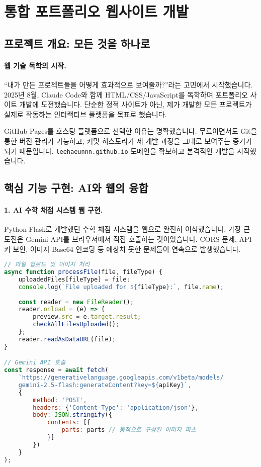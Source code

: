 \section{통합 포트폴리오 웹사이트 개발}

\subsection{프로젝트 개요: 모든 것을 하나로}

\paragraph{웹 기술 독학의 시작.}
``내가 만든 프로젝트들을 어떻게 효과적으로 보여줄까?''라는 고민에서 시작했습니다. 2025년 8월, Claude Code와 함께 HTML/CSS/JavaScript를 독학하며 포트폴리오 사이트 개발에 도전했습니다. 단순한 정적 사이트가 아닌, 제가 개발한 모든 프로젝트가 실제로 작동하는 인터랙티브 플랫폼을 목표로 했습니다.

GitHub Pages를 호스팅 플랫폼으로 선택한 이유는 명확했습니다. 무료이면서도 Git을 통한 버전 관리가 가능하고, 커밋 히스토리가 제 개발 과정을 그대로 보여주는 증거가 되기 때문입니다. \texttt{leehaeunnn.github.io} 도메인을 확보하고 본격적인 개발을 시작했습니다.

\subsection{핵심 기능 구현: AI와 웹의 융합}

\paragraph{1. AI 수학 채점 시스템 웹 구현.}
Python Flask로 개발했던 수학 채점 시스템을 웹으로 완전히 이식했습니다. 가장 큰 도전은 Gemini API를 브라우저에서 직접 호출하는 것이었습니다. CORS 문제, API 키 보안, 이미지 Base64 인코딩 등 예상치 못한 문제들이 연속으로 발생했습니다.

\begin{lstlisting}[language=JavaScript]
// 파일 업로드 및 이미지 처리
async function processFile(file, fileType) {
    uploadedFiles[fileType] = file;
    console.log(`File uploaded for ${fileType}:`, file.name);
    
    const reader = new FileReader();
    reader.onload = (e) => {
        preview.src = e.target.result;
        checkAllFilesUploaded();
    };
    reader.readAsDataURL(file);
}

// Gemini API 호출
const response = await fetch(
    `https://generativelanguage.googleapis.com/v1beta/models/
    gemini-2.5-flash:generateContent?key=${apiKey}`,
    {
        method: 'POST',
        headers: {'Content-Type': 'application/json'},
        body: JSON.stringify({
            contents: [{
                parts: parts // 동적으로 구성된 이미지 파츠
            }]
        })
    }
);
\end{lstlisting}

